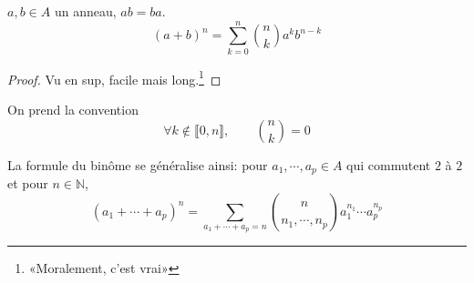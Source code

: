 \begin{prop}
    \Hyp $a, b\in A$ un anneau, $ab=ba$.
    \Conc \[
        (a+b)^n=\sum_{k=0}^n\binom nk a^kb^{n-k}
    \]
\end{prop}

\begin{proof}
    Vu en sup, facile mais long.\footnote{«Moralement, c'est vrai»}
\end{proof}

\begin{rem}
    On prend la convention \[
        \forall k\not\in\llbracket 0, n\rrbracket, \qquad \binom nk=0
    \]
\end{rem}

La formule du binôme se généralise ainsi: pour $a_1, \cdots, a_p\in A$ qui commutent $2$ à $2$ et pour $n\in\mathbb N$, \[
    (a_1+\cdots +a_p)^n=\sum_{a_1+\cdots +a_p=n}\binom{n}{n_1, \cdots, n_p}a_1^{n_1}\cdots a_p^{n_p}
\]
